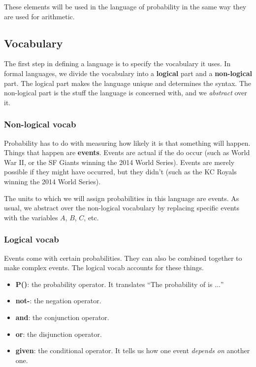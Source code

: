 \documentclass[letterpaper,10pt]{article}
\begin{document}
These elements will be used in the language of probability in the same way they are used for arithmetic.

\subsection{Vocabulary}

The first step in defining a language is to specify the vocabulary it uses.  In formal languages, we divide the vocabulary into a \textbf{logical} part and a \textbf{non-logical} part. The logical part makes the language unique and determines the syntax.  The non-logical part is the stuff the language is concerned with, and we \textit{abstract} over it.

\subsubsection{Non-logical vocab}

Probability has to do with measuring how likely it is that something will happen.  Things that happen are \textbf{events}. Events are actual if the do occur (such as World War II, or the SF Giants winning the 2014 World Series). Events are merely possible if they might have occurred, but they didn't (such as the KC Royals winning the 2014 World Series).

The units to which we will assign probabilities in this language are events.  As usual, we abstract over the non-logical vocabulary by replacing specific events with the variables $A$, $B$, $C$, etc.

\subsubsection{Logical vocab}

Events come with certain probabilities.  They can also be combined together to make complex events.  The logical vocab accounts for these things.
\begin{itemize}
 \item \textbf{P(\underline{\hspace{5mm}})}: the probability operator. It translates ``The probability of \underline{\hspace{5mm}} is $\ldots$''
 \item \textbf{not-}: the negation operator.
 \item \textbf{and}: the conjunction operator.
 \item \textbf{or}: the disjunction operator.
 \item \textbf{given}: the conditional operator. It tells us how one event \textit{depends on} another one.
\end{itemize}
\end{document}
